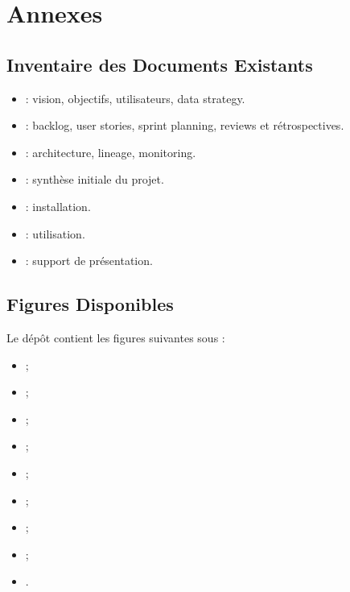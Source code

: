 \chapter{Annexes}

\section{Inventaire des Documents Existants}

\begin{itemize}
    \item {}: vision, objectifs, utilisateurs, data strategy.
    \item {}: backlog, user stories, sprint planning, reviews et rétrospectives.
    \item {}: architecture, lineage, monitoring.
    \item {}: synthèse initiale du projet.
    \item {}: installation.
    \item {}: utilisation.
    \item {}: support de présentation.
\end{itemize}

\section{Figures Disponibles}

Le dépôt contient les figures suivantes sous :

\begin{itemize}
    \item {};
    \item {};
    \item {};
    \item {};
    \item {};
    \item {};
    \item {};
    \item {};
    \item {}.
\end{itemize}

